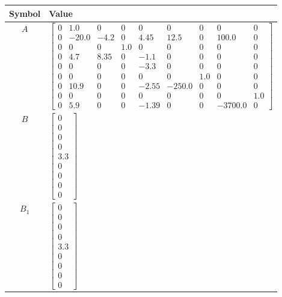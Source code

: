 \begin{tabular}{cl}
\hline
  Symbol  & Value                                                                                                                                                                                                                                                                                                                                                                                                                                               \\
\hline
   $A$    & $\left[\begin{matrix}0 & 1.0 & 0 & 0 & 0 & 0 & 0 & 0 & 0\\0 & -20.0 & -4.2 & 0 & 4.45 & 12.5 & 0 & 100.0 & 0\\0 & 0 & 0 & 1.0 & 0 & 0 & 0 & 0 & 0\\0 & 4.7 & 8.35 & 0 & -1.1 & 0 & 0 & 0 & 0\\0 & 0 & 0 & 0 & -3.3 & 0 & 0 & 0 & 0\\0 & 0 & 0 & 0 & 0 & 0 & 1.0 & 0 & 0\\0 & 10.9 & 0 & 0 & -2.55 & -250.0 & 0 & 0 & 0\\0 & 0 & 0 & 0 & 0 & 0 & 0 & 0 & 1.0\\0 & 5.9 & 0 & 0 & -1.39 & 0 & 0 & -3700.0 & 0\end{matrix}\right]$                      \\
   $B$    & $\left[\begin{matrix}0\\0\\0\\0\\3.3\\0\\0\\0\\0\end{matrix}\right]$                                                                                                                                                                                                                                                                                                                                                                                \\
 $B_{1}$  & $\left[\begin{matrix}0\\0\\0\\0\\3.3\\0\\0\\0\\0\end{matrix}\right]$                                                                                                                                                                                                                                                                                                                                                                                \\

\end{tabular}
